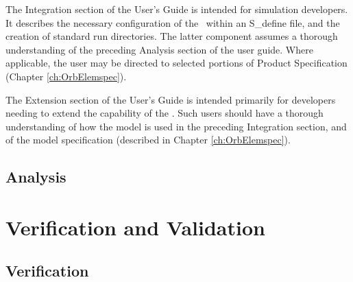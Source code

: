 The Integration section of the User's Guide is intended for simulation
developers.
It describes the necessary configuration of the \OrbElemDesc\
within an
S\_define file, and the creation of standard run directories.  The
latter
component assumes a thorough understanding of the preceding Analysis
section of the user guide.
Where applicable, the user may be directed to selected portions of
Product Specification (Chapter \ref{ch:OrbElemspec}).

The Extension section of the User's Guide is intended primarily for
developers
needing to extend the capability of the \OrbElemDesc.  Such users
should have a
thorough understanding of how the model is used in the preceding
Integration section, and of the model
specification (described in Chapter \ref{ch:OrbElemspec}).


\section{Analysis}






\chapter{Verification and
Validation}\label{ch:OrbElemivv}

\section{Verification}



